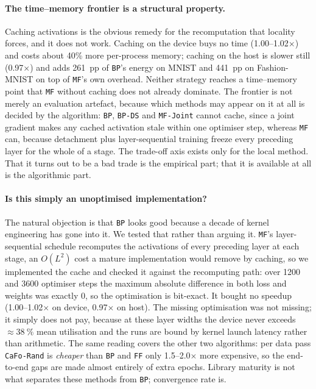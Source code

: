 \documentclass{llncs}
\newcommand{\FF}{\texttt{FF}}
\newcommand{\MF}{\texttt{MF}}
\newcommand{\BP}{\texttt{BP}}
\newcommand{\CaFoRand}{\texttt{CaFo-Rand}}
\begin{document}
\paragraph{The time--memory frontier is a structural property.}
Caching activations is the obvious remedy for the recomputation that locality
forces, and it does not work. Caching on the device buys no time
(\numrange{1.00}{1.02}$\times$) and costs about \num{40}\% more per-process
memory; caching on the host is slower still (\num{0.97}$\times$) and adds
\num{261}~pp of \BP{}'s energy on MNIST and \num{441}~pp on Fashion-MNIST on
top of \MF{}'s own overhead. Neither strategy reaches a time--memory point
that \MF{} without caching does not already dominate. The frontier is not
merely an evaluation artefact, because which methods may appear on it at all
is decided by the algorithm: \BP{}, \texttt{BP-DS} and \texttt{MF-Joint}
cannot cache, since a joint gradient makes any cached activation stale within
one optimiser step, whereas \MF{} can, because detachment plus
layer-sequential training freeze every preceding layer for the whole of a
stage. The trade-off axis exists only for the local method. That it turns out
to be a bad trade is the empirical part; that it is available at all is the
algorithmic part.

\paragraph{Is this simply an unoptimised implementation?}
The natural objection is that \BP{} looks good because a decade of kernel
engineering has gone into it. We tested that rather than arguing it. \MF{}'s
layer-sequential schedule recomputes the activations of every preceding layer
at each stage, an $O(L^2)$ cost a mature implementation would remove by
caching, so we implemented the cache and checked it against the recomputing
path: over \num{1200} and \num{3600} optimiser steps the maximum absolute
difference in both loss and weights was exactly \num{0}, so the optimisation is
bit-exact. It bought no speedup (\numrange{1.00}{1.02}$\times$ on device,
\num{0.97}$\times$ on host). The missing optimisation was not missing; it
simply does not pay, because at these layer widths the device never exceeds
${\approx}\SI{38}{\percent}$ mean utilisation and the runs are bound by kernel
launch latency rather than arithmetic. The same reading covers the other two
algorithms: per data pass \CaFoRand{} is \emph{cheaper} than \BP{} and \FF{}
only \numrange{1.5}{2.0}$\times$ more expensive, so the end-to-end gaps are
made almost entirely of extra epochs. Library maturity is not what separates
these methods from \BP{}; convergence rate is.
\end{document}
